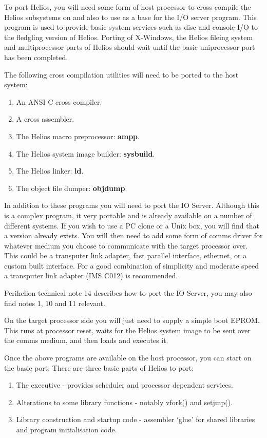 To port Helios, you will need some form of host processor to cross compile
the Helios subsystems on and also to use as a base for the I/O server program.
This program is used to provide basic system services such as disc and console
I/O to the fledgling version of Helios. Porting of X-Windows, the Helios
fileing system and multiprocessor parts of Helios should wait until the basic
uniprocessor port has been completed.

The following cross compilation utilities will need to be ported to the
host system:
\begin{enumerate}
\item An ANSI C cross compiler.

\item A cross assembler.

\item The Helios macro preprocessor: {\bf ampp}.

\item The Helios system image builder: {\bf sysbuild}.

\item The Helios linker: {\bf ld}.

\item The object file dumper: {\bf objdump}.
\end{enumerate}

In addition to these programs you will need to port the IO Server. Although
this is a complex program, it very portable and is already available on a
number of different systems. If you wish to use a PC clone or a Unix box,
you will find that a version already exists.
You will then need to add some form of comms driver for whatever medium you
choose to communicate with the target processor over. This could be a
transputer link adapter, fast parallel interface, ethernet, or a custom
built interface. For a good combination of simplicity
and moderate speed a transputer link adapter (IMS C012) is recommended.

Perihelion technical note 14 describes how to port the IO Server, you may
also find notes 1, 10 and 11 relevant.

On the target processor side you will just need to supply a simple boot
EPROM. This runs at processor reset, waits for the Helios system image
to be sent over the comms medium, and then loads and executes it.

Once the above programs are available on the host processor, you can start on
the basic port. There are three basic parts of Helios to port:
\begin{enumerate}
\item The executive - provides scheduler and processor dependent services.

\item Alterations to some library functions - notably vfork() and setjmp().

\item Library construction and startup code - assembler `glue' for shared
libraries and program initialisation code.
\end{enumerate}

